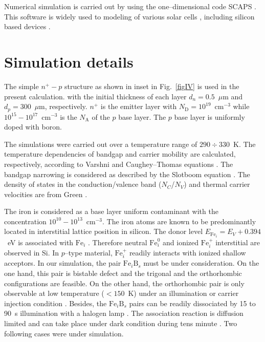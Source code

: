 \documentclass [sort&compress] {elsarticle}
\begin{document}
Numerical simulation is carried out by using the one--dimensional code SCAPS \cite{SCAPS1,SCAPS2}.
This software is widely used to modeling of various solar cells \cite{SCAPSuse1,SCAPSuse2,SCAPSuse3,SCAPSuse5,SCAPSuseSi1,SCAPSuseSi4,SCAPSuseSi3},
including silicon based devices \cite{SCAPSuseSi1,SCAPSuseSi3,SCAPSuseSi4}.

\section{Simulation details}
The simple $n^+-p$ structure as  shown in inset in Fig.~\ref{figIV} is used in the present calculation.
with the initial thickness of each layer $d_n=0.5$~$\mu$m and $d_p=300$~$\mu$m, respectively.
$n^+$ is the emitter layer with $N_\mathrm{D}=10^{19}$~cm$^{-3}$ while $10^{15}-10^{17}$~cm$^{-3}$ is the $N_\mathrm{A}$ of the $p$ base layer.
The $p$ base layer is uniformly doped with boron.

The simulations  were carried out over a temperature range of $290\div330$~K.
The temperature dependencies of bandgap and carrier mobility are calculated, respectively,  according to Varshni and Caughey--Thomas equations \cite{Schroder2006}.
The bandgap narrowing is considered as described by the Slotboom equation \cite{Markvart,ZHOU20188}.
The density of states in the conduction/valence band ($N_C$/$N_V$) and thermal carrier velocities are from Green \cite{Nc:Green}.


The iron is considered as a base layer uniform contaminant with the concentration $10^{10}-10^{13}$~cm$^{-3}$.
The iron atoms are known to be predominantly located in interstitial lattice position in silicon.
The donor level $E_{\mathrm{Fe}_i} = E_V+0.394$~eV is associated with $\mathrm{Fe}_i$ \cite{Rein2,MurphyJAP2011}.
Therefore neutral  $\mathrm{Fe}_i^0$ and ionized $\mathrm{Fe}_i^+$  interstitial are observed in  Si.
In $p$--type material, $\mathrm{Fe}_i^+$ readily interacts with ionized shallow acceptors.
In our simulation, the pair $\mathrm{Fe}_i\mathrm{B}_s$ must be under consideration.
On the one hand, this pair is bistable defect and the trigonal and the orthorhombic configurations are feasible.
On the other hand, the orthorhombic pair is only observable at low temperature ($<150$~K) under an illumination or carrier injection condition \cite{Narland,Sakauchi}.
Besides,  the $\mathrm{Fe}_i\mathrm{B}_s$ pairs can be readily dissociated by 15 to 90~s illumination with a halogen lamp \cite{FeB:Schmidt}.
The association reaction is diffusion limited and can take place under dark condition during tens minute \cite{FeB:kinetic}.
Two following cases were under simulation.
\end{document}
